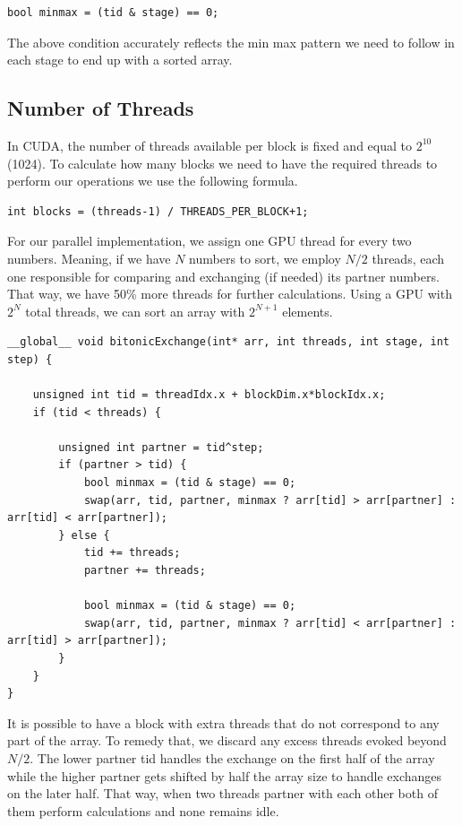 \documentclass[12pt]{report}
\begin{document}
\begin{lstlisting}[style=cstyle]
bool minmax = (tid & stage) == 0;
\end{lstlisting}

The above condition accurately reflects the min max pattern we need to follow in each stage to end up with a sorted array.

\subsection{Number of Threads}

In CUDA, the number of threads available per block is fixed and equal to $2^10$ (1024). To calculate how many blocks we need to have the required threads to perform our operations we use the following formula. 

\begin{lstlisting}[style=cstyle]
int blocks = (threads-1) / THREADS_PER_BLOCK+1;
\end{lstlisting}

For our parallel implementation, we assign one GPU thread for every two numbers. Meaning, if we have $N$ numbers to sort, we employ $N/2$ threads, each one responsible for comparing and exchanging (if needed) its partner numbers. That way, we have 50\% more threads for further calculations. Using a GPU with $2^N$ total threads, we can sort an array with $2^{N+1}$ elements. 

\begin{lstlisting}[style=cstyle]
__global__ void bitonicExchange(int* arr, int threads, int stage, int step) {

    unsigned int tid = threadIdx.x + blockDim.x*blockIdx.x;
    if (tid < threads) {

        unsigned int partner = tid^step;
        if (partner > tid) {
            bool minmax = (tid & stage) == 0;
            swap(arr, tid, partner, minmax ? arr[tid] > arr[partner] : arr[tid] < arr[partner]);
        } else {
            tid += threads;
            partner += threads;

            bool minmax = (tid & stage) == 0;
            swap(arr, tid, partner, minmax ? arr[tid] < arr[partner] : arr[tid] > arr[partner]);
        }
    }
}
\end{lstlisting}

It is possible to have a block with extra threads that do not correspond to any part of the array. To remedy that, we discard any excess threads evoked beyond $N/2$. The lower partner tid handles the exchange on the first half of the array while the higher partner gets shifted by half the array size to handle exchanges on the later half. That way, when two threads partner with each other both of them perform calculations and none remains idle.
\end{document}
